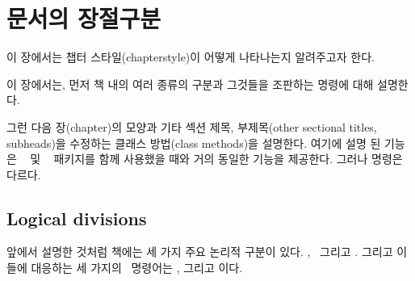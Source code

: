 \chapter{문서의 장절구분}

이 장에서는  챕터 스타일(chapterstyle)이 어떻게 나타나는지 알려주고자 한다.

이 장에서는, 먼저 책 내의 여러 종류의 구분과 그것들을 조판하는 명령에 대해 설명한다.

그런 다음 장(chapter)의 모양과 기타 섹션 제목, 부제목(other sectional titles, subheads)을 수정하는 클래스 방법(class methods)을 설명한다.
여기에 설명 된 기능은 ~\cite{TITLESEC} 및 ~\cite{SECTSTY} 패키지를 함께 사용했을 때와 거의 동일한 기능을 제공한다. 그러나 명령은 다르다.
\section{Logical divisions}

    앞에서 설명한 것처럼 책에는 세 가지 주요 논리적 구분이 있다.
\pixfrontmatter, \pixmainmatter\ 그리고 \pixbackmatter. 그리고 이들에 대응하는 세 가지의 \ltx\ 명령어는 \cmd{\frontmatter}, \cmd{\mainmatter} 그리고 \cmd{\backmatter} 이다.

